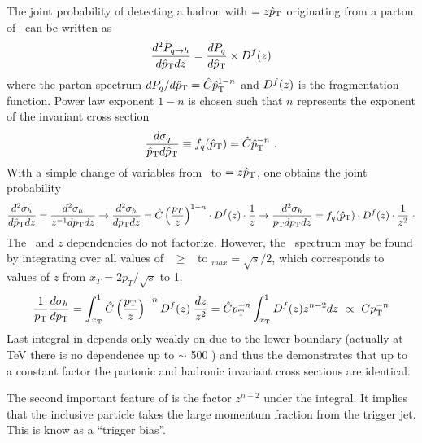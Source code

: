 \documentclass[12pt]{article}
\begin{document}
The joint probability of detecting a hadron with \pt{}$=z\hat{p}_{\rm T}$  originating from a parton of \ptq{}\ can be written as
\begin{equation} \label{eq:jointprob}
{d^2P_{q\rightarrow h}\over d\ensuremath{\hat{p}_{\rm T}}dz}  =  {dP_q \over d\hat{p}_{\rm T}}\times D^f(z)
\end{equation}
where the parton spectrum $ {dP_q / d\hat{p}_{\rm T}} =  \hat{C}\hat{p}_{\rm T}^{1-n}$ and $D^f(z)$ is the fragmentation function. Power law exponent $1-n$ is 
chosen such that $n$ represents the exponent of the invariant cross section 
\begin{equation}\label{eq:powerlawf}
{d\sigma_q\over\ensuremath{\hat{p}_{\rm T}}d\ensuremath{\hat{p}_{\rm T}}}  \equiv f_q(\hat{p}_{\rm T}) = \hat{C}\hat{p}_{\rm T}^{-n}\ .
\end{equation}
With a simple change of variables from \ptq{}\ to \pt{}$=z\hat{p}_{\rm T}$, one obtains the joint probability 
\begin{equation} \label{eq:jointprobInv}
{d^2\sigma_h\over d\ensuremath{\hat{p}_{\rm T}}dz}  = 
        {d^2\sigma_h\over z^{-1}dp_{\rm T}dz} 
    \rightarrow
        {d^2\sigma_h\over d\ensuremath{p_{\rm T}}dz} = \hat{C}\left({p_T\over z}\right)^{1-n}\cdot D^f(z)\cdot{1\over z}
    \rightarrow
         {d^2\sigma_h\over\ensuremath{p_{\rm T}}d\ensuremath{p_{\rm T}}dz} = f_q(\hat{p}_{\rm T})\cdot D^f(z)\cdot{1\over z^2}\ \cdot
\end{equation}
The \pt{}\ and $z$ dependencies do not factorize. However, the \pt{}\ spectrum may be
found by integrating over all values of \ptq{}\ $\geq$ \pt{}\ to \ptq{}$_{max}=\sqrt{s}/2$,
which corresponds to values of $z$ from $x_T=2 p_T/\sqrt{s}$ to 1.
\begin{equation}
\label{eq:dsigma_integral}
{1\over \ensuremath{p_{\rm T}}}{d\sigma_h\over d\ensuremath{p_{\rm T}}}  =
    \int_{x_{\rm T}}^{1} \hat{C}\left({p_{\rm T}\over z}\right)^{-n}D^f(z)\; {dz\over z^{2}}=
    \hat{C}p_{\rm T}^{-n}\int_{x_{\rm T}}^{1} D^f(z) z^{n-2}dz \ \propto\ Cp_{\rm T}^{-n}
\end{equation}
Last integral in  depends only weakly on \pt{} due to the lower boundary \xt{} (actually at  TeV there is no dependence up to $\sim$ 500 \gevc) and thus the  demonstrates that up to a constant factor the partonic and hadronic invariant cross sections are identical.

The second important feature of  is the factor $z^{n-2}$ under the integral. It implies that the inclusive particle 
takes the large momentum fraction from the trigger jet. This is know as a ``trigger bias''. 
\end{document}
